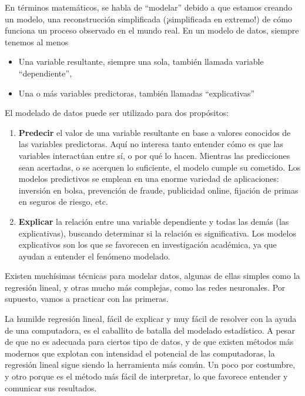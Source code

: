 \documentclass[spanish,]{book}
\providecommand{\tightlist}{%
  \setlength{\itemsep}{0pt}\setlength{\parskip}{0pt}}
\begin{document}
En términos matemáticos, se habla de ``modelar'' debido a que estamos creando un modelo, una reconstrucción simplificada (¡simplificada en extremo!) de cómo funciona un proceso observado en el mundo real. En un modelo de datos, siempre tenemos al menos

\begin{itemize}
\tightlist
\item
  Una variable resultante, siempre una sola, también llamada variable ``dependiente'',
\item
  Una o más variables predictoras, también llamadas ``explicativas''
\end{itemize}

El modelado de datos puede ser utilizado para dos propósitos:

\begin{enumerate}
\def\labelenumi{\arabic{enumi}.}
\item
  \textbf{Predecir} el valor de una variable resultante en base a valores conocidos de las variables predictoras. Aquí no interesa tanto entender cómo es que las variables interactúan entre sí, o por qué lo hacen. Mientras las predicciones sean acertadas, o se acerquen lo suficiente, el modelo cumple su cometido. Los modelos predictivos se emplean en una enorme variedad de aplicaciones: inversión en bolsa, prevención de fraude, publicidad online, fijación de primas en seguros de riesgo, etc.
\item
  \textbf{Explicar} la relación entre una variable dependiente y todas las demás (las explicativas), buscando determinar si la relación es significativa. Los modelos explicativos son los que se favorecen en investigación académica, ya que ayudan a entender el fenómeno modelado.
\end{enumerate}

Existen muchísimas técnicas para modelar datos, algunas de ellas simples como la regresión lineal, y otras mucho más complejas, como las redes neuronales. Por supuesto, vamos a practicar con las primeras.

La humilde regresión lineal, fácil de explicar y muy fácil de resolver con la ayuda de una computadora, es el caballito de batalla del modelado estadístico. A pesar de que no es adecuada para ciertos tipo de datos, y de que existen métodos más modernos que explotan con intensidad el potencial de las computadoras, la regresión lineal sigue siendo la herramienta más común. Un poco por costumbre, y otro porque es el método más fácil de interpretar, lo que favorece entender y comunicar sus resultados.
\end{document}
